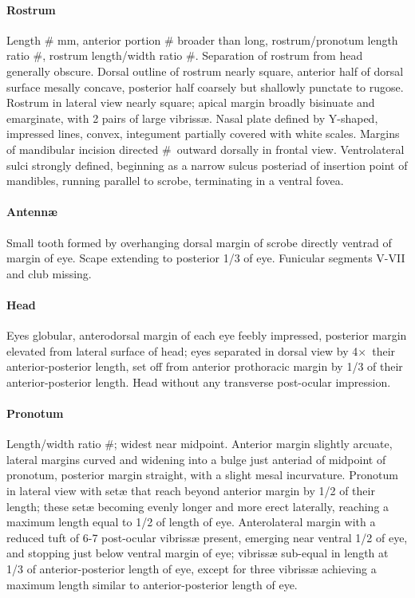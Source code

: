 \documentclass[fleqn,10pt,lineno]{wlpeerj} %
\newcommand{\td}{\textdegree~}
\newcommand{\x}{$\times$~}
\begin{document}
			\paragraph{Rostrum}
				Length \# mm, anterior portion \# broader than long, rostrum/pronotum length ratio \#, rostrum length/width ratio \#.
				Separation of rostrum from head generally obscure. 
				Dorsal outline of rostrum nearly square, anterior half of dorsal surface mesally concave, posterior half coarsely but shallowly punctate to rugose. 
				Rostrum in lateral view nearly square; apical margin broadly bisinuate and emarginate, with 2 pairs of large vibriss{\ae}. 
				Nasal plate defined by Y-shaped, impressed lines, convex, integument partially covered with white scales.
				Margins of mandibular incision directed \#\td outward dorsally in frontal view. 
				Ventrolateral sulci strongly defined, beginning as a narrow sulcus posteriad of insertion point of mandibles, running parallel to scrobe, terminating in a ventral fovea.
			\paragraph{Antenn{\ae}}
				Small tooth formed by overhanging dorsal margin of scrobe directly ventrad of margin of eye.
				Scape extending to posterior 1/3 of eye.
				Funicular segments V-VII and club missing.
			\paragraph{Head}
				Eyes globular, anterodorsal margin of each eye feebly impressed, posterior margin elevated from lateral surface of head; eyes separated in dorsal view by 4\x their anterior-posterior length, set off from anterior prothoracic margin by 1/3 of their anterior-posterior length. 
				Head without any transverse post-ocular impression.
			\paragraph{Pronotum}
				Length/width ratio \#; widest near midpoint. 
				Anterior margin slightly arcuate, lateral margins curved and widening into a bulge just anteriad of midpoint of pronotum, posterior margin straight, with a slight mesal incurvature. 
				Pronotum in lateral view with set{\ae} that reach beyond anterior margin by 1/2 of their length; these set{\ae} becoming evenly longer and more erect laterally, reaching a maximum length equal to 1/2 of length of eye. 
				Anterolateral margin with a reduced tuft of 6-7 post-ocular vibriss{\ae} present, emerging near ventral 1/2 of eye, and stopping just below ventral margin of eye; vibriss{\ae} sub-equal in length at 1/3 of anterior-posterior length of eye, except for three vibriss{\ae} achieving a maximum length similar to anterior-posterior length of eye.
\end{document}
